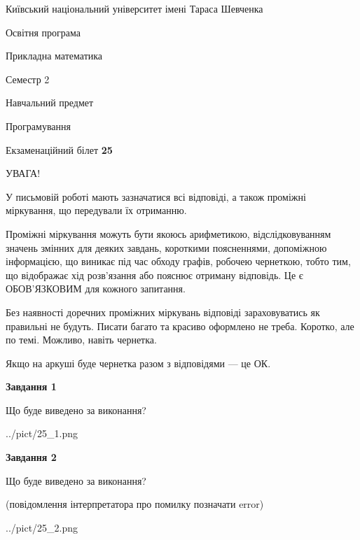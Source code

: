 \documentclass[12pt, ukrainian]{article}
\begin{document}
{{\begin {small}\par
{ \center  Київський національний університет імені Тараса Шевченка \par}
{\parbox {5 cm}{Освітня програма \hfill}{\parbox {7 cm}{Прикладна математика\hfill}}\parbox {6 cm}{\hfill Семестр 2}}\par
{\parbox {5 cm} {Навчальний предмет \hfill}\parbox {7 cm}{Програмування \hfill}\parbox {6cm}{\hfill}\par}\vspace{-7pt} \end{small}}{\center Екзаменаційний білет \No \textbf
{ 25 }\par}}
{
\begin {large}
УВАГА!

У письмовій роботі мають зазначатися всі відповіді, а також проміжні міркування, що передували їх отриманню.

Проміжні міркування можуть бути якоюсь арифметикою, відслідковуванням зна\-чень змінних для деяких завдань,
короткими поясненнями, допоміжною інформацією, що виникає під час обходу графів, робочею чернеткою,
тобто тим, що відображає хід розв’язання або пояснює отриману відповідь.
Це є ОБОВ’ЯЗКОВИМ для кожного запитання.

Без наявності доречних проміжних міркувань відповіді зараховуватись як правиль\-ні не будуть.
Писати багато та красиво оформлено не треба. Коротко, але по темі. Можли\-во, навіть чернетка.

Якщо на аркуші буде чернетка разом з відповідями --- це ОК.

\newpage

{\begin {center}\textbf{Завдання 1}\end {center}}\par
Що буде виведено за виконання?\par
\begin{center}
	{../pict/25_1.png}
\end{center}
\newpage

{\begin {center}\textbf{Завдання 2}\end {center}}\par
Що буде виведено за виконання?\par
 (повідомлення інтерпретатора про помилку позначати error)\par
\begin{center}
	{../pict/25_2.png}
\end{center}
\newpage


\end{large}}
\end{document}
